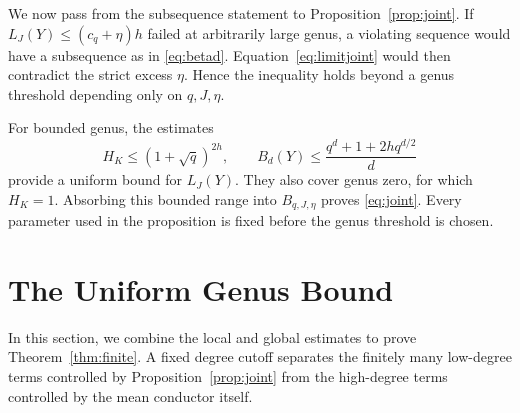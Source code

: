 \documentclass[12pt,onecolumn,draftclsnofoot,letterpaper]{IEEEtran}
\theoremstyle{remark}
\begin{document}
We now pass from the subsequence statement to Proposition~\ref{prop:joint}. If
$L_J(Y)\le(c_q+\eta)h$ failed at arbitrarily large genus, a violating sequence would have a subsequence as in \eqref{eq:betad}. Equation~\eqref{eq:limitjoint} would then contradict the strict excess $\eta$. Hence the inequality holds beyond a genus threshold depending only on $q,J,\eta$.

For bounded genus, the estimates
\begin{equation}
 H_K\le(1+\sqrt q)^{2h},\qquad
 B_d(Y)\le\frac{q^d+1+2h q^{d/2}}d
 \label{eq:boundedgenus}
\end{equation}
provide a uniform bound for $L_J(Y)$. They also cover genus zero, for which $H_K=1$. Absorbing this bounded range into $B_{q,J,\eta}$ proves \eqref{eq:joint}. Every parameter used in the proposition is fixed before the genus threshold is chosen.

\section{The Uniform Genus Bound}\label{sec:upper}
In this section, we combine the local and global estimates to prove Theorem~\ref{thm:finite}. A fixed degree cutoff separates the finitely many low-degree terms controlled by Proposition~\ref{prop:joint} from the high-degree terms controlled by the mean conductor itself.
\end{document}
